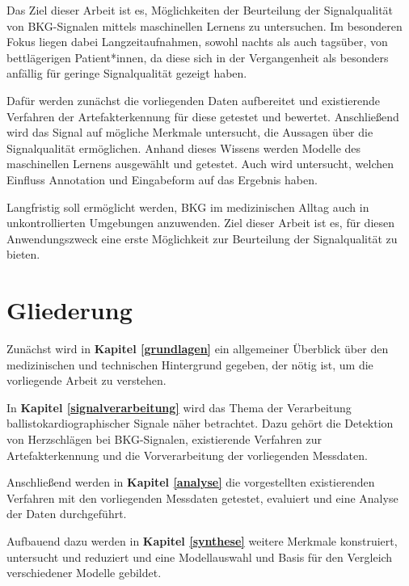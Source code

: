 Das Ziel dieser Arbeit ist es, Möglichkeiten der Beurteilung der Signalqualität von \ac{BKG}-Signalen mittels maschinellen Lernens zu untersuchen. Im besonderen Fokus liegen dabei Langzeitaufnahmen, sowohl nachts als auch tagsüber, von bettlägerigen Patient*innen, da diese sich in der Vergangenheit als besonders anfällig für geringe Signalqualität gezeigt haben.

Dafür werden zunächst die vorliegenden Daten aufbereitet und existierende Verfahren der Artefakterkennung für diese getestet und bewertet. Anschließend wird das Signal auf mögliche Merkmale untersucht, die Aussagen über die Signalqualität ermöglichen. Anhand dieses Wissens werden Modelle des maschinellen Lernens ausgewählt und getestet. Auch wird untersucht, welchen Einfluss Annotation und Eingabeform auf das Ergebnis haben.

Langfristig soll ermöglicht werden, \acf{BKG} im medizinischen Alltag auch in unkontrollierten Umgebungen anzuwenden. Ziel dieser Arbeit ist es, für diesen Anwendungszweck eine erste Möglichkeit zur Beurteilung der Signalqualität zu bieten.%

\section{Gliederung}

Zunächst wird in \textbf{Kapitel \ref{grundlagen}} ein allgemeiner Überblick über den medizinischen und technischen Hintergrund gegeben, der nötig ist, um die vorliegende Arbeit zu verstehen.

In \textbf{Kapitel \ref{signalverarbeitung}} wird das Thema der Verarbeitung ballistokardiographischer Signale näher betrachtet. Dazu gehört die Detektion von Herzschlägen bei \ac{BKG}-Signalen, existierende Verfahren zur Artefakterkennung und die Vorverarbeitung der vorliegenden Messdaten.

Anschließend werden in \textbf{Kapitel \ref{analyse}} die vorgestellten existierenden Verfahren mit den vorliegenden Messdaten getestet, evaluiert und eine Analyse der Daten durchgeführt.

Aufbauend dazu werden in \textbf{Kapitel \ref{synthese}} weitere Merkmale konstruiert, untersucht und reduziert und eine Modellauswahl und Basis für den Vergleich verschiedener Modelle gebildet. %


